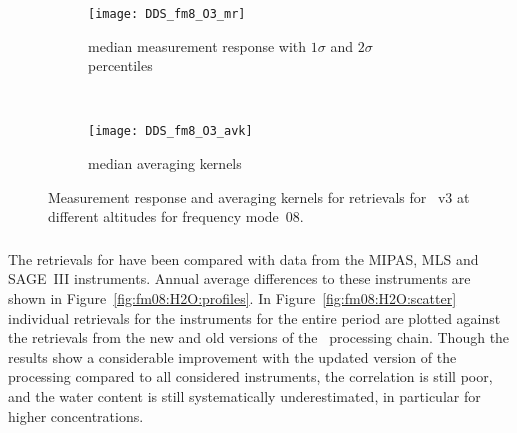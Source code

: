 \begin{figure}[htpb]
    \centering
    \begin{subfigure}[b]{0.49\textwidth}
        \texttt{[image: DDS\_fm8\_O3\_mr]}
        \caption{median measurement response with $1\sigma$ and $2\sigma$
        percentiles}
        \label{fig:fm08:O3:mr}
    \end{subfigure}
    \,
    \begin{subfigure}[b]{0.49\textwidth}
        \texttt{[image: DDS\_fm8\_O3\_avk]}
        \caption{median averaging kernels\newline~}
        \label{fig:fm08:O3:avk}
    \end{subfigure}
    \caption{Measurement response and averaging kernels for 
    retrievals for \smr~v3 at different altitudes for frequency mode~08.}
    \label{fig:fm08:O3:mr_avk}
\end{figure}



\subsubsection{}
\label{sec:fm08:comparison:H2O}
The retrievals for  have been compared with data from the MIPAS,
MLS and SAGE~III instruments. Annual average differences to these instruments
are shown in Figure~\ref{fig:fm08:H2O:profiles}. In
Figure~\ref{fig:fm08:H2O:scatter} individual retrievals for the instruments for
the entire period are plotted against the retrievals from the new and old
versions of the \smr\ processing chain. Though the results show a considerable
improvement with the updated version of the processing compared to all
considered instruments, the correlation is still poor, and the water content is
still systematically underestimated, in particular for higher concentrations.


